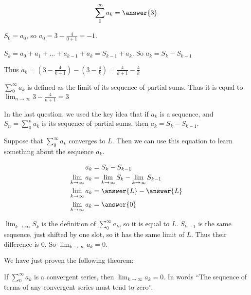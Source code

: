 \documentclass{ximera}
\begin{document}
\begin{theorem}
\begin{question}
\[
\sum_0^\infty a_k = \answer{3}
\]


\begin{hint}
$S_0 = a_0$, so $a_0 = 3-\frac{4}{0+1} = -1$.
\end{hint}

\begin{hint}
$S_k = a_0+a_1+ \dots +a_{k-1}+a_k = S_{k-1}+a_k$.  So $a_k = S_k - S_{k-1}$
\end{hint}

\begin{hint}
Thus $a_k = (3-\frac{4}{k+1})  - (3-\frac{4}{k}) = \frac{4}{k+1} - \frac{4}{k}$
\end{hint}


\begin{hint}
 $\sum_0^\infty a_k $ is defined as the limit of its sequence of partial sums.  Thus it is equal to $\lim_{n \to \infty} 3-\frac{4}{n+1} = 3$
\end{hint}

\end{question}

\begin{explanation}
In the last question, we used the key idea that if $a_k$ is a sequence, and $S_n = \sum_0^n a_k $ is its sequence of partial sums, then $a_k = S_k-S_{k-1}$.

Suppose that $\sum_0^\infty a_k$ converges to $L$.  Then we can use this equation to learn something about the sequence $a_k$.

\begin{align*}
	a_k &= S_k-S_{k-1}\\
	\lim_{k \to \infty} a_k &= \lim_{k \to \infty} S_k -  \lim_{k \to \infty} S_{k-1}\\
	\lim_{k \to \infty} a_k &= \answer{L} - \answer{L}\\
	\lim_{k \to \infty} a_k &= \answer{0}
\end{align*}

\begin{hint}
	$\lim_{k \to \infty} S_{k}$ is the definition of $\sum_0^\infty a_k$, so it is equal to $L$.  $S_{k-1}$ is the same sequence, just shifted by one slot, so it has the same limit of $L$.  Thus their difference is $0$.  So $\lim_{k \to \infty} a_k = 0$.
\end{hint}
\end{explanation}

We have just proven the following theorem:

\begin{theorem}
	If $\sum_0^\infty a_k$ is a convergent series, then $\lim_{k \to \infty} a_k = 0$.  In words ``The sequence of terms of any convergent series must tend to zero''.
\end{theorem}


\end{theorem}
\end{document}
